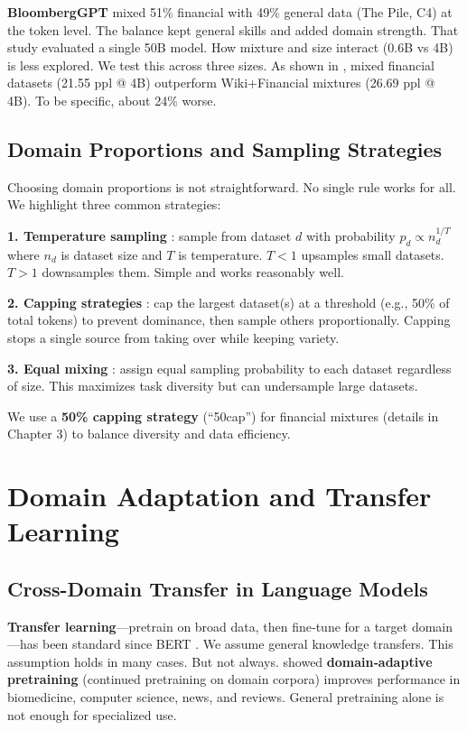 \textbf{BloombergGPT} \parencite{wu2023bloomberggpt} mixed 51\% financial with 49\% general data (The Pile, C4) at the token level. The balance kept general skills and added domain strength. That study evaluated a single 50B model. How mixture and size interact (0.6B vs 4B) is less explored. We test this across three sizes. As shown in , mixed financial datasets (21.55 ppl @ 4B) outperform Wiki+Financial mixtures (26.69 ppl @ 4B). To be specific, about 24\% worse.

\subsection{Domain Proportions and Sampling Strategies}

Choosing domain proportions is not straightforward. No single rule works for all. We highlight three common strategies:

\textbf{1. Temperature sampling} \parencite{arivazhagan2019massively}: sample from dataset $d$ with probability $p_d \propto n_d^{1/T}$ where $n_d$ is dataset size and $T$ is temperature. $T < 1$ upsamples small datasets. $T > 1$ downsamples them. Simple and works reasonably well.

\textbf{2. Capping strategies} \parencite{longpre2023pretrainer}: cap the largest dataset(s) at a threshold (e.g., 50\% of total tokens) to prevent dominance, then sample others proportionally. Capping stops a single source from taking over while keeping variety.

\textbf{3. Equal mixing} \parencite{sanh2022multitask}: assign equal sampling probability to each dataset regardless of size. This maximizes task diversity but can undersample large datasets.

We use a \textbf{50\% capping strategy} (``50cap'') for financial mixtures (details in Chapter 3) to balance diversity and data efficiency.

\section{Domain Adaptation and Transfer Learning}

\subsection{Cross-Domain Transfer in Language Models}

\textbf{Transfer learning}—pretrain on broad data, then fine‑tune for a target domain—has been standard since BERT \parencite{devlin2019bert,pan2010transfer,zhuang2020comprehensive}. We assume general knowledge transfers. This assumption holds in many cases. But not always. \textcite{gururangan2020don} showed \textbf{domain‑adaptive pretraining} (continued pretraining on domain corpora) improves performance in biomedicine, computer science, news, and reviews. General pretraining alone is not enough for specialized use.

